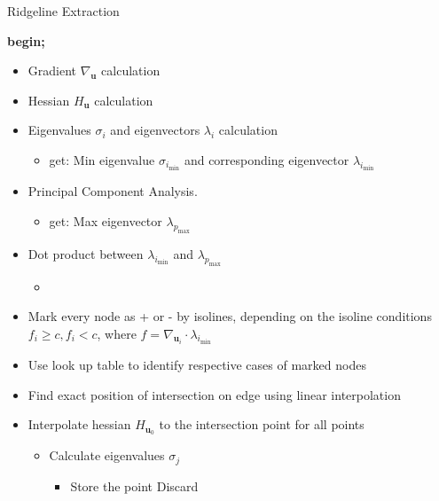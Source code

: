 \begin{algorithm}[H]
\caption{Ridgeline Extraction}
\SetAlgoLined
{}
 \textbf{begin;}\\
 {
  \begin{itemize}
  \item Gradient $ \nabla_{\textbf{u}} $ calculation
  \item Hessian $ H_{\textbf{u}} $ calculation
  \item Eigenvalues $ \sigma_{i} $ and eigenvectors $ \lambda_{i} $ calculation
	  \begin{itemize}[itemsep=0.1mm]
	  	\item get: Min eigenvalue $ \sigma_{i_{\min}} $ and corresponding eigenvector $ \lambda_{i_{\min}}$
	  \end{itemize}
	\end{itemize} 
 }
  {
  	\begin{itemize}
	  \item Principal Component Analysis.
		  \begin{itemize}
		  	\item get: Max eigenvector $ \lambda_{p_{\max}}$
		  \end{itemize}
	  \item Dot product between $ \lambda_{i_{\min}} $ and $\lambda_{p_{\max}} $
		  \begin{itemize}
				\item {}
		  \end{itemize}
	  \item Mark every node as + or - by isolines, depending on the isoline conditions $ f_{i}\geq c, f_{i} < c$, where $ f = \nabla_{\textbf{u}_{i}}\cdot\lambda_{i_{\min}}$
	  \item Use look up table to identify respective cases of marked nodes
	  \item Find exact position of intersection on edge using linear interpolation
      \item Interpolate hessian $ H_{\textbf{u}_{0}} $ to the intersection point for all points
			\begin{itemize}
			  		\item Calculate eigenvalues $ \sigma_{j} $
				  		\begin{itemize}
				  			\item {}
				  			{\hspace{30mm} Store the point}
				  			{\hspace{30mm} Discard}
				  		\end{itemize}		  		 
			\end{itemize}
	\end{itemize}
}
\end{algorithm}


